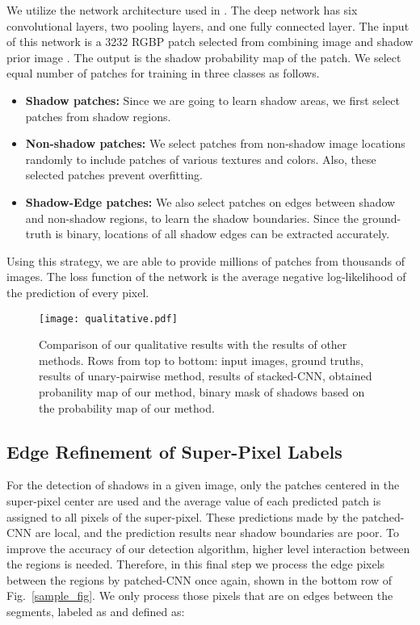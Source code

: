 \documentclass[letterpaper, 10 pt, conference]{ieeeconf}
\begin{document}
We utilize the network architecture used in \cite{Vicente2}. The deep network has six convolutional layers, two pooling layers, and one fully connected layer. The input of this network is a 3232 RGBP patch selected from combining  image and shadow prior image . The output is the shadow probability map of the patch.
We select equal number of patches for training in three classes as follows.

\begin{itemize}
\item {\textbf{Shadow patches:}} Since we are going to learn shadow areas, we first select patches from shadow regions. 

\item {\textbf{Non-shadow patches:}} We select patches from non-shadow image locations randomly to include patches of various textures and colors. Also, these selected patches prevent overfitting. 

\item {\textbf{Shadow-Edge patches:}} We also select patches on edges between shadow and non-shadow regions, to learn the shadow boundaries. Since the ground-truth is binary, locations of all shadow edges can be extracted accurately.
\end{itemize}

Using this strategy, we are able to provide millions of patches from thousands of images. The loss function of the network is the average negative log-likelihood of the prediction of every pixel.

\begin{figure*}[b!]
    \centering
    \texttt{[image: qualitative.pdf]}
    \caption{Comparison of our qualitative results with the results of other methods. Rows from top to bottom: input images, ground truths, results of unary-pairwise method, results of stacked-CNN, obtained probanility map of our method, binary mask of shadows based on the probability map of our method.}
    \label{fig:qual_res}
\end{figure*}

\subsection{Edge Refinement of Super-Pixel Labels}
\label{detection}
For the detection of shadows in a given image, only the patches centered in the super-pixel center are used and the average value of each predicted patch is assigned to all pixels of the super-pixel. These predictions made by the patched-CNN are local, and the prediction results near shadow boundaries are poor. To improve the accuracy of our detection algorithm, higher level interaction between the regions is needed. Therefore, in this final step we process the edge pixels between the regions by patched-CNN once again, shown in the bottom row of Fig.~\ref{sample_fig}. We only process those pixels that are on edges between the segments, labeled as  and defined as:
\end{document}
